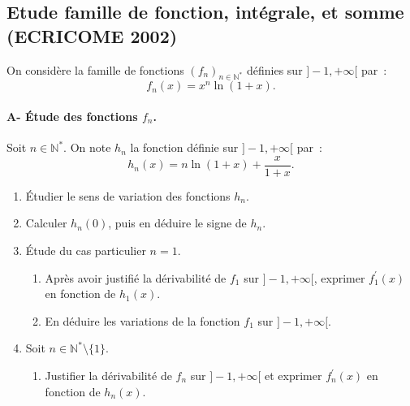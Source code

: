 \subsection{Etude famille de fonction, intégrale, et somme (ECRICOME 2002)}

\begin{exercice}



On consid\`ere la famille de fonctions $(f_n)_{n\in\mathbb{N}^*}$ d\'efinies
sur $]-1,+\infty[$ par~: 
\begin{equation*}
f_n(x)=x^n\ln (1+x).
\end{equation*}


\paragraph{A- \'Etude des fonctions $f_n$.\\}




Soit $n\in \mathbb{N}^*$. On note $h_n$ la fonction d\'efinie sur $%
]-1,+\infty[$ par~: 
\begin{equation*}
h_n(x)=n\ln(1+x)+\frac{x}{1+x}.
\end{equation*}

\begin{enumerate}
\item \'{E}tudier le sens de variation des fonctions $h_{n}$.

\item Calculer $h_{n}(0)$, puis en d\'{e}duire le signe de $h_{n}$.

\item \'{E}tude du cas particulier $n=1$.

\begin{enumerate}
\item Apr\`{e}s avoir justifi\'{e} la d\'{e}rivabilit\'{e} de $f_{1}$ sur $%
]-1,+\infty [$, exprimer $f_{1}^{\prime }(x)$ en fonction de $h_{1}(x)$.

\item En d\'{e}duire les variations de la fonction $f_{1}$ sur $]-1,+\infty
[ $.
\end{enumerate}

\item Soit $n\in \mathbb{N}^{*}\setminus \{1\}$.

\begin{enumerate}
\item Justifier la d\'{e}rivabilit\'{e} de $f_{n}$ sur $]-1,+\infty [$ et
exprimer $f_{n}^{\prime }(x)$ en fonction de $h_{n}(x)$.


\end{enumerate}
\end{enumerate}
\end{exercice}
